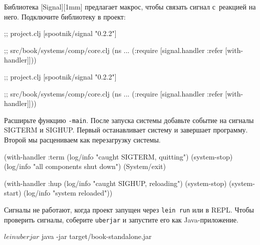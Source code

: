 
Библиотека [Signal][1mm] предлагает макрос,
чтобы связать сигнал с~реакцией на него. Подключите библиотеку в проект:

\label{with-handler}

\ifnarrow

\begin{english}
  \begin{clojure}
;; project.clj
[spootnik/signal "0.2.2"]

;; src/book/systems/comp/core.clj
(ns ...
  (:require
   [signal.handler :refer
    [with-handler]]))
  \end{clojure}
\end{english}

\else

\begin{english}
  \begin{clojure}
;; project.clj
[spootnik/signal "0.2.2"]

;; src/book/systems/comp/core.clj
(ns ...
  (:require [signal.handler :refer [with-handler]]))
  \end{clojure}
\end{english}

\fi

Расширьте функцию \verb|-main|. После запуска системы добавьте событие на
сигналы SIGTERM и SIGHUP. Первый останавливает систему и завершает
программу. Второй мы расцениваем как перезагрузку системы.



\begin{english}
  \begin{clojure}
(with-handler :term
  (log/info "caught SIGTERM, quitting")
  (system-stop)
  (log/info "all components shut down")
  (System/exit)

(with-handler :hup
  (log/info "caught SIGHUP, reloading")
  (system-stop)
  (system-start)
  (log/info "system reloaded"))
  \end{clojure}
\end{english}

Сигналы не работают, когда проект запущен через \verb|lein run| или в
REPL. Чтобы проверить сигналы, соберите \verb|uberjar| и запустите его как
Java-приложение.

\begin{english}
  \begin{bash}
$ lein uberjar
$ java -jar target/book-standalone.jar
  \end{bash}
\end{english}

